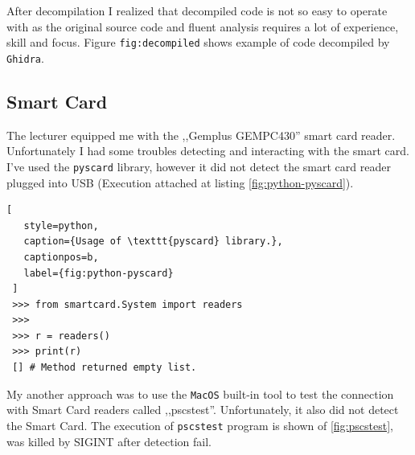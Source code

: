 After decompilation I realized that decompiled code is not so easy to operate with as the original source code and fluent analysis requires a lot of experience, skill and focus. Figure \texttt{fig:decompiled} shows example of code decompiled by \texttt{Ghidra}.


\begin{figure}[!htb]
\end{figure}

\subsection{Smart Card}

The lecturer equipped me with the ,,Gemplus GEMPC430'' smart card reader. Unfortunately I had some troubles detecting and interacting with the smart card. I've used the \texttt{pyscard} library, however it did not detect the smart card reader plugged into USB (Execution attached at listing \ref{fig:python-pyscard}).


\begin{minipage}{\linewidth}
  \begin{lstlisting}[
   style=python,
   caption={Usage of \texttt{pyscard} library.},
   captionpos=b,
   label={fig:python-pyscard}
 ]
 >>> from smartcard.System import readers
 >>>
 >>> r = readers()
 >>> print(r)
 [] # Method returned empty list.
  \end{lstlisting}
\end{minipage}

My another approach was to use the \texttt{MacOS} built-in tool to test the connection with Smart Card readers called ,,pscstest''. Unfortunately, it also did not detect the Smart Card. The execution of \texttt{pscstest} program is shown of \ref{fig:pscstest}, was killed by SIGINT after detection fail.

